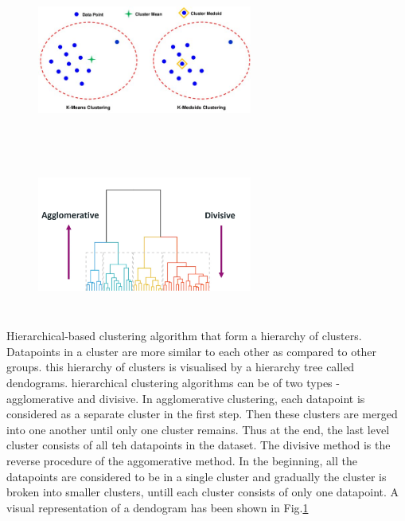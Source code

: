 \begin{figure}
    \centering
    \begin{minipage}[t]{.45\textwidth}
      \centering
      \includegraphics[width=200pt,height=150pt]{pictures/The-graphical-representation-of-the-difference-between-the-k-means-and-k-medoids_W640.jpg}
      \label{fig:kmean-kmedoid}
    \end{minipage}%
    \hspace{1cm}
    \begin{minipage}[t]{.45\textwidth}
      \centering
      \includegraphics[width=200pt,height=150pt]{pictures/dendogram.png}
      \label{fig:dendogram}
    \end{minipage}
\end{figure}

Hierarchical-based clustering algorithm that form a hierarchy of clusters. Datapoints in a cluster are more similar to each other as compared to other groups. this hierarchy of clusters is visualised by a hierarchy tree called dendograms. hierarchical clustering algorithms can be of two types - agglomerative and divisive. In agglomerative clustering, each datapoint is considered as a separate cluster in the first step. Then these clusters are merged into one another until only one cluster remains. Thus at the end, the last level cluster consists of all teh datapoints in the dataset. The divisive method is the reverse procedure of the aggomerative method. In the beginning, all the datapoints are considered to be in a single cluster and gradually the cluster is broken into smaller clusters, untill each cluster consists of only one datapoint. A visual representation of a dendogram has been shown in Fig.\ref*{fig:dendogram}

